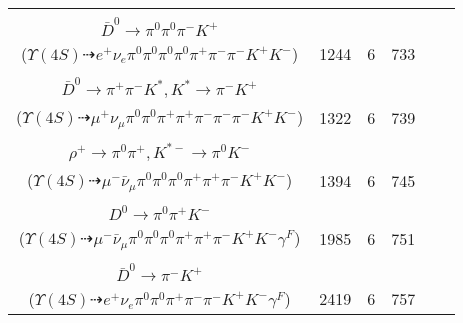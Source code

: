 \documentclass[landscape]{article}
\newcounter{rownumbers}
\newcommand\rn{\stepcounter{rownumbers}\arabic{rownumbers}}
\newcommand{\EOLP}{\\ \hline} %
\newcommand{\topoTags}[1]{#1} %
\begin{document}
\begin{longtable}{clcccc}
\rn & \makecell[l]{ $ 
\Upsilon(4S) \rightarrow B^{+} B^{-} ,
B^{+} \rightarrow e^{+} \nu_{e} \bar{D}^{*0} ,
B^{-} \rightarrow \rho^{-} D^{0} ,
\bar{D}^{*0} \rightarrow \pi^{0} \bar{D}^{0} ,
\rho^{-} \rightarrow \pi^{0} \pi^{-} ,
D^{0} \rightarrow \pi^{+} K^{-} ,
$ \\ $
\bar{D}^{0} \rightarrow \pi^{0} \pi^{0} \pi^{-} K^{+} 
$ \\ ($
\Upsilon(4S) \dashrightarrow e^{+} \nu_{e} \pi^{0} \pi^{0} \pi^{0} \pi^{0} \pi^{+} \pi^{-} \pi^{-} K^{+} K^{-} 
$) } & \topoTags{1244 & }6 & 733 \EOLP

\rn & \makecell[l]{ $ 
\Upsilon(4S) \rightarrow B^{+} B^{-} ,
B^{+} \rightarrow \mu^{+} \nu_{\mu} \bar{D}^{*0} ,
B^{-} \rightarrow \rho^{-} D^{0} ,
\bar{D}^{*0} \rightarrow \pi^{0} \bar{D}^{0} ,
\rho^{-} \rightarrow \pi^{0} \pi^{-} ,
D^{0} \rightarrow \pi^{+} K^{-} ,
$ \\ $
\bar{D}^{0} \rightarrow \pi^{+} \pi^{-} K^{*} ,
K^{*} \rightarrow \pi^{-} K^{+} 
$ \\ ($
\Upsilon(4S) \dashrightarrow \mu^{+} \nu_{\mu} \pi^{0} \pi^{0} \pi^{+} \pi^{+} \pi^{-} \pi^{-} \pi^{-} K^{+} K^{-} 
$) } & \topoTags{1322 & }6 & 739 \EOLP

\rn & \makecell[l]{ $ 
\Upsilon(4S) \rightarrow B^{+} B^{-} ,
B^{+} \rightarrow \rho^{+} \bar{D}^{0} ,
B^{-} \rightarrow \mu^{-} \bar{\nu}_{\mu} D^{0} ,
\rho^{+} \rightarrow \pi^{0} \pi^{+} ,
\bar{D}^{0} \rightarrow \pi^{-} K^{+} ,
D^{0} \rightarrow \rho^{+} K^{*-} ,
$ \\ $
\rho^{+} \rightarrow \pi^{0} \pi^{+} ,
K^{*-} \rightarrow \pi^{0} K^{-} 
$ \\ ($
\Upsilon(4S) \dashrightarrow \mu^{-} \bar{\nu}_{\mu} \pi^{0} \pi^{0} \pi^{0} \pi^{+} \pi^{+} \pi^{-} K^{+} K^{-} 
$) } & \topoTags{1394 & }6 & 745 \EOLP

\rn & \makecell[l]{ $ 
\Upsilon(4S) \rightarrow B^{+} B^{-} ,
B^{+} \rightarrow \rho^{+} \bar{D}^{0} ,
B^{-} \rightarrow \mu^{-} \bar{\nu}_{\mu} D^{*0} \gamma^{F} ,
\rho^{+} \rightarrow \pi^{0} \pi^{+} ,
\bar{D}^{0} \rightarrow \pi^{-} K^{+} ,
D^{*0} \rightarrow \pi^{0} D^{0} ,
$ \\ $
D^{0} \rightarrow \pi^{0} \pi^{+} K^{-} 
$ \\ ($
\Upsilon(4S) \dashrightarrow \mu^{-} \bar{\nu}_{\mu} \pi^{0} \pi^{0} \pi^{0} \pi^{+} \pi^{+} \pi^{-} K^{+} K^{-} \gamma^{F} 
$) } & \topoTags{1985 & }6 & 751 \EOLP

\rn & \makecell[l]{ $ 
\Upsilon(4S) \rightarrow B^{+} B^{-} ,
B^{+} \rightarrow e^{+} \nu_{e} \bar{D}^{*0} \gamma^{F} ,
B^{-} \rightarrow \rho^{-} D^{0} ,
\bar{D}^{*0} \rightarrow \pi^{0} \bar{D}^{0} ,
\rho^{-} \rightarrow \pi^{0} \pi^{-} ,
D^{0} \rightarrow \pi^{+} K^{-} ,
$ \\ $
\bar{D}^{0} \rightarrow \pi^{-} K^{+} 
$ \\ ($
\Upsilon(4S) \dashrightarrow e^{+} \nu_{e} \pi^{0} \pi^{0} \pi^{+} \pi^{-} \pi^{-} K^{+} K^{-} \gamma^{F} 
$) } & \topoTags{2419 & }6 & 757 \EOLP


\end{longtable}
\end{document}
